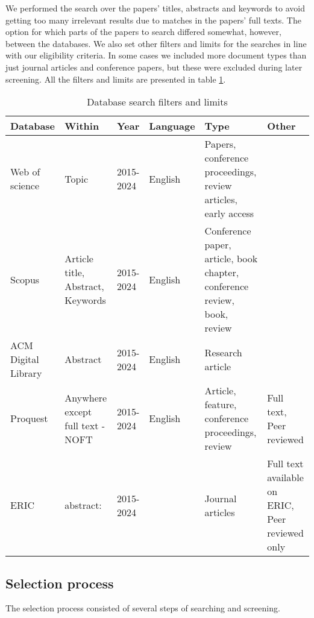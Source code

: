 We performed the search over the papers' titles, abstracts and keywords to avoid getting too many irrelevant results due to matches in the papers' full texts. The option for which parts of the papers to search differed somewhat, however, between the databases. We also set other filters and limits for the searches in line with our eligibility criteria. In some cases we included more document types than just journal articles and conference papers, but these were excluded during later screening. All the filters and limits are presented in table \ref{tab:filtersandlimits}.

\begin{table}[h!]
\centering
\caption{Database search filters and limits}
\label{tab:filtersandlimits}
\begin{tabularx}{\textwidth}{|X|X|X|X|X|X|}
\hline
\textbf{Database} & \textbf{Within} & \textbf{Year} & \textbf{Language} & \textbf{Type} & \textbf{Other} \\
\hline
Web of science & Topic & 2015-2024 & English & Papers, conference proceedings, review articles, early access & \\
\hline
Scopus & Article title, Abstract, Keywords & 2015-2024 & English & Conference paper, article, book chapter, conference review, book, review & \\
\hline
ACM Digital Library & Abstract & 2015-2024 & English & Research article & \\
\hline
Proquest & Anywhere except full text - NOFT & 2015-2024 & English & Article, feature, conference proceedings, review & Full text, Peer reviewed \\
\hline
ERIC & abstract: & 2015-2024 & & Journal articles & Full text available on ERIC, Peer reviewed only \\
\hline
\end{tabularx}
\end{table}


\subsection{Selection process}\label{sec:slr-selection-process}
The selection process consisted of several steps of searching and screening.

